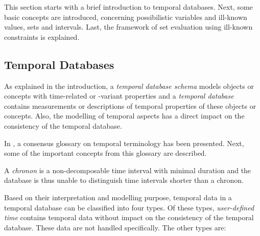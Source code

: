 This section starts with a brief introduction to temporal databases. Next, some basic concepts are introduced, concerning possibilistic variables and ill-known values, sets and intervals. Last, the framework of set evaluation using ill-known constraints \cite{Pon11} is explained.

\subsection{Temporal Databases}
As explained in the introduction, a \emph{temporal database schema} models objects or concepts with time-related or -variant properties and a \emph{temporal database} contains measurements or descriptions of temporal properties of these objects or concepts. Also, the modelling of temporal aspects has a direct impact on the consistency of the temporal database.

In \cite{Dyreson1994}, a consensus glossary on temporal terminology has been presented. Next, some of the important concepts from this glossary are described. 

A \emph{chronon} is a non-decomposable time interval with minimal duration and the database is thus unable to distinguish time intervals shorter than a chronon. 

Based on their interpretation and modelling purpose, temporal data in a temporal database can be classified into four types. Of these types, \emph{user-defined time} contains temporal data without impact on the consistency of the temporal database. These data are not handled specifically. The other types are:







